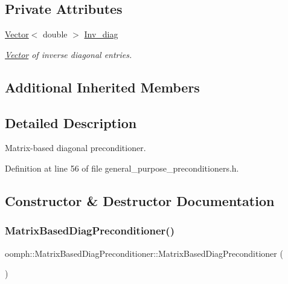 \subsection*{Private Attributes}
\begin{DoxyCompactItemize}
\item 
\hyperlink{classoomph_1_1Vector}{Vector}$<$ double $>$ \hyperlink{classoomph_1_1MatrixBasedDiagPreconditioner_a2d794c7cec62acb81ad2e93d49a401ed}{Inv\+\_\+diag}
\begin{DoxyCompactList}\small\item\em \hyperlink{classoomph_1_1Vector}{Vector} of inverse diagonal entries. \end{DoxyCompactList}\end{DoxyCompactItemize}
\subsection*{Additional Inherited Members}


\subsection{Detailed Description}
Matrix-\/based diagonal preconditioner. 

Definition at line 56 of file general\+\_\+purpose\+\_\+preconditioners.\+h.



\subsection{Constructor \& Destructor Documentation}
\mbox{\label{classoomph_1_1MatrixBasedDiagPreconditioner_a8ed53c8e6a4b7a522d6b4042db14f58a}} 
\subsubsection{\texorpdfstring{Matrix\+Based\+Diag\+Preconditioner()}{MatrixBasedDiagPreconditioner()}\hspace{0.1cm}{\footnotesize\ttfamily [1/2]}}
{\footnotesize\ttfamily oomph\+::\+Matrix\+Based\+Diag\+Preconditioner\+::\+Matrix\+Based\+Diag\+Preconditioner (\begin{DoxyParamCaption}{ }\end{DoxyParamCaption})\hspace{0.3cm}{\ttfamily [inline]}}



